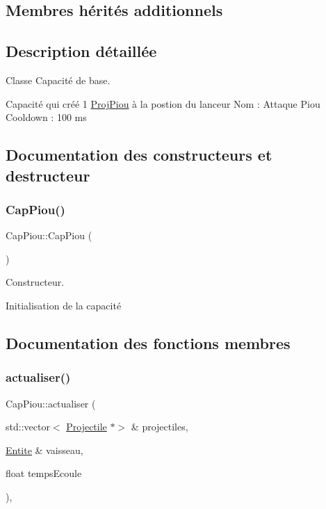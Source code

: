 \subsection*{Membres hérités additionnels}


\subsection{Description détaillée}
Classe Capacité de base. 

Capacité qui créé 1 \hyperlink{class_proj_piou}{Proj\+Piou} à la postion du lanceur Nom \+: Attaque Piou Cooldown \+: 100 ms 

\subsection{Documentation des constructeurs et destructeur}
\mbox{\label{class_cap_piou_aa2ed61fb1313a447cf8444399001750d}} 
\subsubsection{\texorpdfstring{Cap\+Piou()}{CapPiou()}}
{\footnotesize\ttfamily Cap\+Piou\+::\+Cap\+Piou (\begin{DoxyParamCaption}{ }\end{DoxyParamCaption})}



Constructeur. 

Initialisation de la capacité 

\subsection{Documentation des fonctions membres}
\mbox{\label{class_cap_piou_a0823f301d48377ca2e14a0cd17922716}} 
\subsubsection{\texorpdfstring{actualiser()}{actualiser()}}
{\footnotesize\ttfamily Cap\+Piou\+::actualiser (\begin{DoxyParamCaption}\item[{std\+::vector$<$ \hyperlink{class_projectile}{Projectile} $\ast$$>$ \&}]{projectiles,  }\item[{\hyperlink{class_entite}{Entite} \&}]{vaisseau,  }\item[{float}]{temps\+Ecoule }\end{DoxyParamCaption})\hspace{0.3cm}{\ttfamily [override]}, {\ttfamily [virtual]}}



